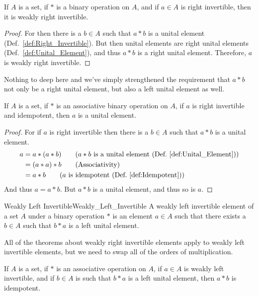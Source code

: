     \begin{theorem}
        If $A$ is a set, if $*$ is a binary operation on $A$, and if $a\in{A}$
        is right invertible, then it is weakly right invertible.
    \end{theorem}
    \begin{proof}
        For then there is a $b\in{A}$ such that $a*b$ is a unital element
        (Def.~\ref{def:Right_Invertible}). But then unital elements are
        right unital elements (Def.~\ref{def:Unital_Element}), and thus $a*b$
        is a right unital element. Therefore, $a$ is weakly right invertible.
    \end{proof}
    Nothing to deep here and we've simply strengthened the requirement that
    $a*b$ not only be a right unital element, but also a left unital element as
    well.
    \begin{theorem}
        \label{thm:assoc_right_idem_inv_is_unit}%
        If $A$ is a set, if $*$ is an associative binary operation on $A$, if
        $a$ is right invertible and idempotent, then $a$ is a unital element.
    \end{theorem}
    \begin{proof}
        For if $a$ is right invertible then there is a $b\in{A}$ such that
        $a*b$ is a unital element.
        \begin{align}
            a&=a*(a*b)
            \tag{$a*b$ is a unital element (Def.~\ref{def:Unital_Element})}\\
            &=(a*a)*b
            \tag{Associativity}\\
            &=a*b
            \tag{$a$ is idempotent (Def.~\ref{def:Idempotent})}
        \end{align}
        And thus $a=a*b$. But $a*b$ is a unital element, and thus so is $a$.
    \end{proof}
    \begin{fdefinition}{Weakly Left Invertible}{Weakly_Left_Invertible}
        A weakly left invertible element of a \gls{set} $A$ under a
        \gls{binary operation} $*$ is an element $a\in{A}$ such that there
        exists a $b\in{A}$ such that $b*a$ is a left unital element.
    \end{fdefinition}
    All of the theorems about weakly right invertible elements apply to weakly
    left invertible elements, but we need to swap all of the orders of
    multiplication.
    \begin{theorem}
        If $A$ is a set, if $*$ is an associative operation on $A$, if $a\in{A}$
        is weakly left invertible, and if $b\in{A}$ is such that $b*a$ is a left
        unital element, then $a*b$ is idempotent.
    \end{theorem}
